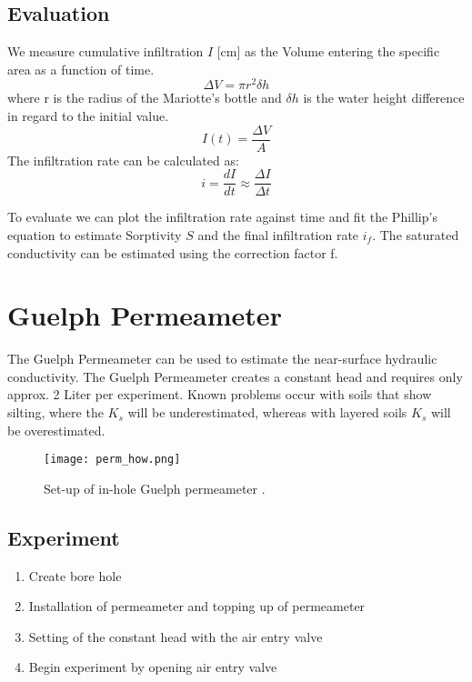 \documentclass[
10pt, %
a4paper, %
oneside, %
headinclude,footinclude, %
BCOR5mm, %
]{scrartcl}
\begin{document}
\subsection{Evaluation}
We measure cumulative infiltration $I$ [cm] as the Volume entering the specific area as a function of time. 
 \begin{equation}\label{eq_infSR}
 \Delta V= \pi r^2 \delta h
 \end{equation}
 where r is the radius of the Mariotte's bottle and $\delta h$ is the water height difference in regard to the initial value.
 \begin{equation}\label{eq_infSR}
I(t) =\frac{\Delta V}{A}
 \end{equation}
The infiltration rate can be calculated as:
 \begin{equation}\label{eq_infSR}
 i = \frac{dI}{dt}\approx\frac{\Delta I}{\Delta t}
 \end{equation}

To evaluate we can plot the infiltration rate against time and fit the Phillip's equation to estimate Sorptivity $S$ and the final infiltration rate $i_f$. The saturated conductivity can be estimated using the correction factor f. 

\section{Guelph Permeameter}

The Guelph Permeameter can be used to estimate the near-surface hydraulic conductivity. The Guelph Permeameter creates a constant head and requires only approx. 2 Liter per experiment. Known problems occur with soils that show silting, where the $K_s$ will be underestimated, whereas with  layered soils $K_s$ will be overestimated. 

\begin{figure}
	\texttt{[image: perm\_how.png]}
	\caption{Set-up of in-hole Guelph permeameter \cite{guelph_eil}.}
\end{figure}
 
 \subsection{Experiment}
 \begin{enumerate}
 	\item Create bore hole
 	\item Installation of permeameter and topping up of permeameter 
 	\item Setting of the constant head with the air entry valve
 	\item Begin experiment by opening air entry valve
 \end{enumerate}
 
\end{document}
